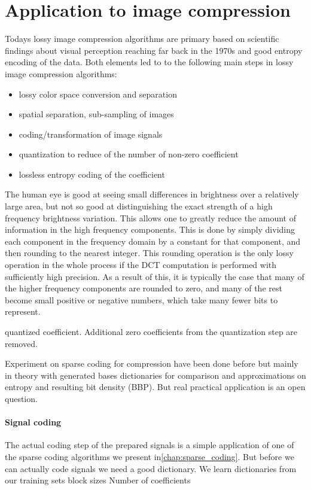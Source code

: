 \section{Application to image compression}
Todays lossy image compression algorithms are primary based on scientific
findings about visual perception reaching far back in the 1970s\cite{?} and
good entropy encoding of the data. Both elements led to to the
following main steps in lossy image compression algorithms:
\begin{itemize}
 \item lossy color space conversion and separation
 \item spatial separation, sub-sampling of images
 \item coding/transformation of image signals
 \item quantization to reduce of the number of non-zero coefficient 
 \item lossless entropy coding of the coefficient 
\end{itemize}
The human eye is good at seeing small differences in brightness over
a relatively large area, but not so good at distinguishing the exact strength
of a high frequency brightness variation. This allows one to greatly reduce the
amount of information in the high frequency components. This is done by simply
dividing each component in the frequency domain by a constant for that
component, and then rounding to the nearest integer. This rounding operation is
the only lossy operation in the whole process if the DCT computation is
performed with sufficiently high precision. As a result of this, it is
typically the case that many of the higher frequency components are rounded to
zero, and many of the rest become small positive or negative numbers, which
take many fewer bits to represent.

quantized coefficient. Additional zero coefficients from the quantization step
are removed.


Experiment on sparse coding for compression have been done before but mainly in
theory with generated bases dictionaries for comparison and approximations on
entropy and resulting bit density (BBP). But real practical application is an
open question.



\paragraph{Signal coding}
The actual coding step of the prepared signals is a simple application of one
of the sparse coding algorithms we present in\ref{chap:sparse_coding}.
But before we can actually code signals we need a good dictionary.
We learn dictionaries from our training sets 
block sizes
Number of coefficients


